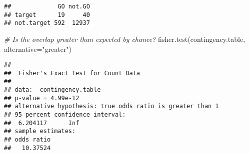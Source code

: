 \documentclass[
]{article}
\newenvironment{Shaded}{\begin{snugshade}}{\end{snugshade}}
\newcommand{\AttributeTok}[1]{\textcolor[rgb]{0.77,0.63,0.00}{#1}}
\newcommand{\CommentTok}[1]{\textcolor[rgb]{0.56,0.35,0.01}{\textit{#1}}}
\newcommand{\FunctionTok}[1]{\textcolor[rgb]{0.00,0.00,0.00}{#1}}
\newcommand{\NormalTok}[1]{#1}
\newcommand{\StringTok}[1]{\textcolor[rgb]{0.31,0.60,0.02}{#1}}
\begin{document}
\begin{verbatim}
##             GO not.GO
## target      19     40
## not.target 592  12937
\end{verbatim}

\begin{Shaded}
\begin{Highlighting}[]
\CommentTok{\# Is the overlap greater than expected by chance?}
\FunctionTok{fisher.test}\NormalTok{(contingency.table, }\AttributeTok{alternative=}\StringTok{"greater"}\NormalTok{)}
\end{Highlighting}
\end{Shaded}

\begin{verbatim}
## 
##  Fisher's Exact Test for Count Data
## 
## data:  contingency.table
## p-value = 4.99e-12
## alternative hypothesis: true odds ratio is greater than 1
## 95 percent confidence interval:
##  6.204117      Inf
## sample estimates:
## odds ratio 
##   10.37524
\end{verbatim}
\end{document}
